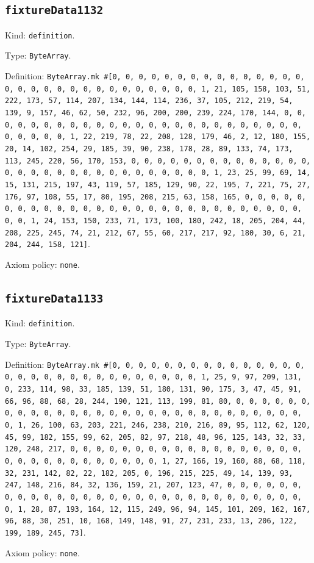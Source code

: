 \documentclass[11pt]{article}
\begin{document}
\subsection*{\texttt{fixtureData1132}}
\noindent Kind: \texttt{definition}.\par
\noindent Type: \texttt{ByteArray}.\par
\noindent Definition: \texttt{ByteArray.mk \#[0, 0, 0, 0, 0, 0, 0, 0, 0, 0, 0, 0, 0, 0, 0, 0, 0, 0, 0, 0, 0, 0, 0, 0, 0, 0, 0, 0, 0, 0, 1, 21, 105, 158, 103, 51, 222, 173, 57, 114, 207, 134, 144, 114, 236, 37, 105, 212, 219, 54, 139, 9, 157, 46, 62, 50, 232, 96, 200, 200, 239, 224, 170, 144, 0, 0, 0, 0, 0, 0, 0, 0, 0, 0, 0, 0, 0, 0, 0, 0, 0, 0, 0, 0, 0, 0, 0, 0, 0, 0, 0, 0, 0, 0, 1, 22, 219, 78, 22, 208, 128, 179, 46, 2, 12, 180, 155, 20, 14, 102, 254, 29, 185, 39, 90, 238, 178, 28, 89, 133, 74, 173, 113, 245, 220, 56, 170, 153, 0, 0, 0, 0, 0, 0, 0, 0, 0, 0, 0, 0, 0, 0, 0, 0, 0, 0, 0, 0, 0, 0, 0, 0, 0, 0, 0, 0, 0, 0, 1, 23, 25, 99, 69, 14, 15, 131, 215, 197, 43, 119, 57, 185, 129, 90, 22, 195, 7, 221, 75, 27, 176, 97, 108, 55, 17, 80, 195, 208, 215, 63, 158, 165, 0, 0, 0, 0, 0, 0, 0, 0, 0, 0, 0, 0, 0, 0, 0, 0, 0, 0, 0, 0, 0, 0, 0, 0, 0, 0, 0, 0, 0, 0, 1, 24, 153, 150, 233, 71, 173, 100, 180, 242, 18, 205, 204, 44, 208, 225, 245, 74, 21, 212, 67, 55, 60, 217, 217, 92, 180, 30, 6, 21, 204, 244, 158, 121]}.\par
\noindent Axiom policy: \texttt{none}.\par
\subsection*{\texttt{fixtureData1133}}
\noindent Kind: \texttt{definition}.\par
\noindent Type: \texttt{ByteArray}.\par
\noindent Definition: \texttt{ByteArray.mk \#[0, 0, 0, 0, 0, 0, 0, 0, 0, 0, 0, 0, 0, 0, 0, 0, 0, 0, 0, 0, 0, 0, 0, 0, 0, 0, 0, 0, 0, 0, 1, 25, 9, 97, 209, 131, 0, 233, 114, 98, 33, 185, 139, 51, 180, 131, 90, 175, 3, 47, 45, 91, 66, 96, 88, 68, 28, 244, 190, 121, 113, 199, 81, 80, 0, 0, 0, 0, 0, 0, 0, 0, 0, 0, 0, 0, 0, 0, 0, 0, 0, 0, 0, 0, 0, 0, 0, 0, 0, 0, 0, 0, 0, 0, 1, 26, 100, 63, 203, 221, 246, 238, 210, 216, 89, 95, 112, 62, 120, 45, 99, 182, 155, 99, 62, 205, 82, 97, 218, 48, 96, 125, 143, 32, 33, 120, 248, 217, 0, 0, 0, 0, 0, 0, 0, 0, 0, 0, 0, 0, 0, 0, 0, 0, 0, 0, 0, 0, 0, 0, 0, 0, 0, 0, 0, 0, 0, 0, 1, 27, 166, 19, 160, 88, 68, 118, 32, 231, 142, 82, 22, 182, 205, 0, 196, 215, 225, 49, 14, 139, 93, 247, 148, 216, 84, 32, 136, 159, 21, 207, 123, 47, 0, 0, 0, 0, 0, 0, 0, 0, 0, 0, 0, 0, 0, 0, 0, 0, 0, 0, 0, 0, 0, 0, 0, 0, 0, 0, 0, 0, 0, 0, 1, 28, 87, 193, 164, 12, 115, 249, 96, 94, 145, 101, 209, 162, 167, 96, 88, 30, 251, 10, 168, 149, 148, 91, 27, 231, 233, 13, 206, 122, 199, 189, 245, 73]}.\par
\noindent Axiom policy: \texttt{none}.\par
\end{document}
